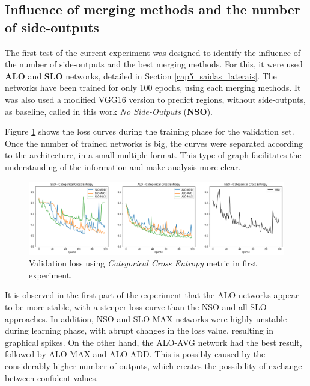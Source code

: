 \subsection{Influence of merging methods and the number of side-outputs}
\label{cap6_experm_1_qtd_saidas}

The first test of the current experiment was designed to identify the influence of the number of side-outputs and the best merging methods.
For this, it were used \textbf{ALO} and \textbf{SLO} networks, detailed in Section \ref{cap5_saidas_laterais}.
The networks have been trained for only 100 epochs, using each merging methods.
It was also used a modified VGG16 version to predict regions, without side-outputs, as baseline, called in this work \textit{No Side-Outputs} (\textbf{NSO}).

{
\color{blue}
Figure \ref{fig:kitti_validation_loss_100epochs} shows the loss curves during the training phase for the validation set.
Once the number of trained networks is big, the curves were separated according to the architecture, in a small multiple format.
This type of graph facilitates the understanding of the information and make analysis more clear.
}

\begin{figure}
  \centering
  \includegraphics[width=1\textwidth]{../imagens/visualiz_dados/kitti_alo-slo-nso_training.png} %
  \caption{Validation loss using \textit{Categorical Cross Entropy} metric in first experiment.}
  \label{fig:kitti_validation_loss_100epochs}
\end{figure}

It is observed in the first part of the experiment that the ALO networks appear to be more stable, with a steeper loss curve than the NSO and all SLO approaches.
In addition, NSO and SLO-MAX networks were highly unstable during learning phase, with abrupt changes in the loss value, resulting in graphical spikes.
On the other hand, the ALO-AVG network had the best result, followed by ALO-MAX and ALO-ADD.
This is possibly caused by the considerably higher number of outputs, which creates the possibility of exchange between confident values.


